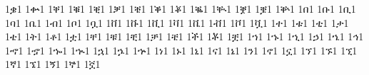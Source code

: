{1ቌ1 %
1ቍ1 %
1ቐ1 %
1ቑ1 %
1ቒ1 %
1ቓ1 %
1ቔ1 %
1ቕ1 %
1ቖ1 %
1ቘ1 %
1ቚ1 %
1ቛ1 %
1ቜ1 %
1ቝ1 %
1በ1 %
1ቡ1 %
1ቢ1 %
1ባ1 %
1ቤ1 %
1ብ1 %
1ቦ1 %
1ቧ1 %
1ቨ1 %
1ቩ1 %
1ቪ1 %
1ቫ1 %
1ቬ1 %
1ቭ1 %
1ቮ1 %
1ቯ1 %
1ተ1 %
1ቱ1 %
1ቲ1 %
1ታ1 %
1ቴ1 %
1ት1 %
1ቶ1 %
1ቷ1 %
1ቸ1 %
1ቹ1 %
1ቺ1 %
1ቻ1 %
1ቼ1 %
1ች1 %
1ቾ1 %
1ቿ1 %
1ኀ1 %
1ኁ1 %
1ኂ1 %
1ኃ1 %
1ኄ1 %
1ኅ1 %
1ኆ1 %
1ኇ1 %
1ኈ1 %
1ኊ1 %
1ኋ1 %
1ኌ1 %
1ኍ1 %
1ነ1 %
1ኑ1 %
1ኒ1 %
1ና1 %
1ኔ1 %
1ን1 %
1ኖ1 %
1ኗ1 %
1ኘ1 %
1ኙ1 %
1ኚ1 %
1ኛ1 %
1ኜ1 %
1ኝ1 %
1ኞ1 %
1ኟ1 %
}
